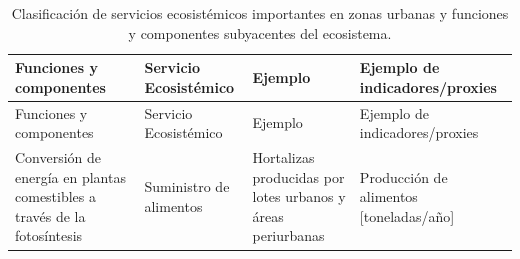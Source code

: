 \documentclass[12pt,a4paper,openany]{book}
\theoremstyle{definition}
\theoremstyle{definition}
\theoremstyle{definition}
\theoremstyle{remark}
\begin{document}
\begin{longtable}[]{@{}llll@{}}
\caption{\label{tab:clasf-SerAm} Clasificación de servicios ecosistémicos
importantes en zonas urbanas y funciones y componentes subyacentes del
ecosistema.}\tabularnewline
\toprule
\begin{minipage}[b]{0.26\columnwidth}\raggedright\strut
Funciones y componentes\strut
\end{minipage} & \begin{minipage}[b]{0.22\columnwidth}\raggedright\strut
Servicio Ecosistémico\strut
\end{minipage} & \begin{minipage}[b]{0.19\columnwidth}\raggedright\strut
Ejemplo\strut
\end{minipage} & \begin{minipage}[b]{0.22\columnwidth}\raggedright\strut
Ejemplo de indicadores/proxies\strut
\end{minipage}\tabularnewline
\midrule
\endfirsthead
\toprule
\begin{minipage}[b]{0.26\columnwidth}\raggedright\strut
Funciones y componentes\strut
\end{minipage} & \begin{minipage}[b]{0.22\columnwidth}\raggedright\strut
Servicio Ecosistémico\strut
\end{minipage} & \begin{minipage}[b]{0.19\columnwidth}\raggedright\strut
Ejemplo\strut
\end{minipage} & \begin{minipage}[b]{0.22\columnwidth}\raggedright\strut
Ejemplo de indicadores/proxies\strut
\end{minipage}\tabularnewline
\midrule
\endhead
\begin{minipage}[t]{0.26\columnwidth}\raggedright\strut
Conversión de energía en plantas comestibles a través de la
fotosíntesis\strut
\end{minipage} & \begin{minipage}[t]{0.22\columnwidth}\raggedright\strut
Suministro de alimentos\strut
\end{minipage} & \begin{minipage}[t]{0.19\columnwidth}\raggedright\strut
Hortalizas producidas por lotes urbanos y áreas periurbanas\strut
\end{minipage} & \begin{minipage}[t]{0.22\columnwidth}\raggedright\strut
Producción de alimentos {[}toneladas/año{]}\strut
\end{minipage}\tabularnewline

\end{longtable}
\end{document}
